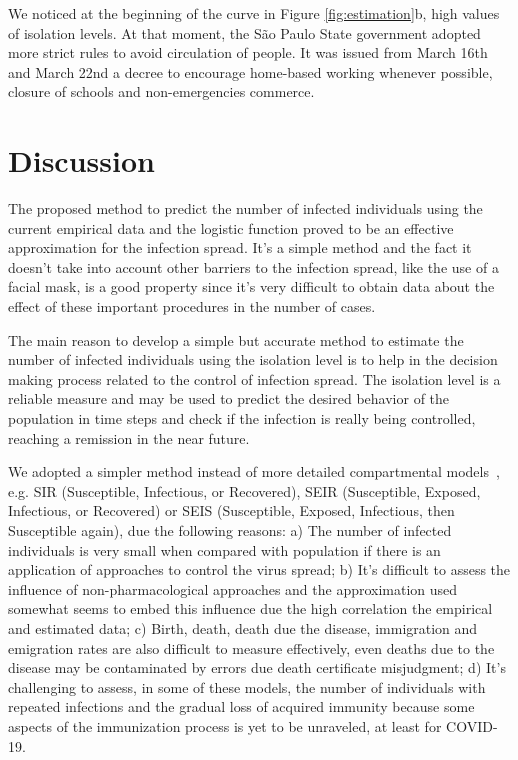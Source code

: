 \documentclass[review]{elsarticle}
\begin{document}
We noticed at the beginning of the curve in Figure \ref{fig:estimation}b, high values of isolation levels. 
At that moment, the São Paulo State government adopted more strict rules to avoid circulation of people. 
It was issued from March 16th and March 22nd a decree to encourage home-based working whenever possible, 
closure of schools and non-emergencies commerce\cite{Cruz2020}.

\section{Discussion}

The proposed method to predict the number of infected individuals 
using the current empirical data and the logistic function proved 
to be an effective approximation for the infection spread. 
It’s a simple method and the fact it doesn’t take into account 
other barriers to the infection spread, like the use of a facial mask, 
is a good property since it’s very difficult to obtain data about 
the effect of these important procedures in the number of cases.

The main reason to develop a simple but accurate method to estimate 
the number of infected individuals using the isolation level is to help 
in the decision making process related to the control of infection spread. 
The isolation level is a reliable measure and may be used to predict 
the desired behavior of the population in time steps and check if the infection 
is really being controlled, reaching a remission in the near future.

We adopted a simpler method instead of more detailed 
compartmental models~\cite{Ross1916,Ross1917a,Ross1917b}, 
e.g. SIR (Susceptible, Infectious, or Recovered), SEIR (Susceptible, Exposed, Infectious, or Recovered) 
or SEIS (Susceptible, Exposed, Infectious, then Susceptible again), due the following reasons: 
a) The number of infected individuals is very small when compared with population if there is 
    an application of approaches to control the virus spread; 
b) It’s difficult to assess the influence of non-pharmacological approaches and the approximation 
    used somewhat seems to embed this influence due the high correlation 
   the empirical and estimated data; 
c) Birth, death, death due the disease, immigration and emigration rates 
   are also difficult to measure effectively, even deaths due to the disease 
   may be contaminated by errors due death certificate misjudgment; 
d) It’s challenging to assess, in some of these models, the number of 
    individuals with repeated infections and the gradual loss of acquired 
    immunity because some aspects of the immunization process is 
   yet to be unraveled, at least for COVID-19.
\end{document}
